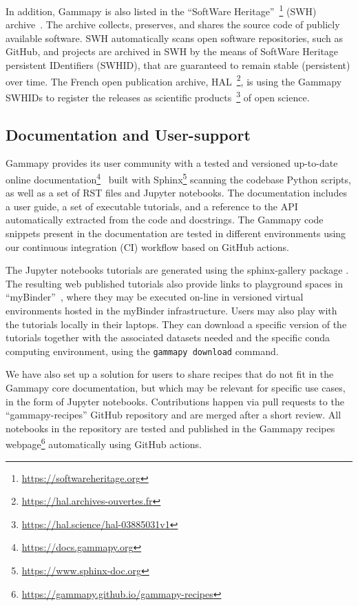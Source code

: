\documentclass[longauth]{aa}
\newcommand{\code}[1]{\texttt{#1}}
\newcommand{\gammapy}{Gammapy\xspace}
\newcommand{\github}{GitHub\xspace}
\begin{document}
In addition, \gammapy is also listed in the \enquote{SoftWare
Heritage}~\footnote{\url{https://softwareheritage.org}} (SWH) archive~\cite{DiCosmo2020}.
The archive collects, preserves, and shares the source code of publicly available software.
SWH automatically scans open software repositories, such as GitHub, and projects are archived in SWH by the
means of SoftWare Heritage persistent IDentifiers (SWHID), that are guaranteed to remain stable (persistent)
over time. The French open publication archive, HAL~\footnote{\url{https://hal.archives-ouvertes.fr}},
is using the \gammapy SWHIDs to register the releases as scientific
products~\footnote{\url{https://hal.science/hal-03885031v1}} of open science.

\subsection{Documentation and User-support}
\label{ssec:documentation-and-user-support}
\gammapy provides its user community with a tested and versioned up-to-date
online
documentation\footnote{\url{https://docs.gammapy.org}}~\citep{2019ASPC..523..357B}
built with Sphinx\footnote{\url{https://www.sphinx-doc.org}} scanning the
codebase Python scripts, as well as a set of RST files and Jupyter notebooks.
The documentation includes a user guide, a set of executable
tutorials, and a reference to the API automatically extracted from the code and
docstrings. The \gammapy code snippets present in the documentation are tested
in different environments using our continuous integration (CI) workflow based
on \github actions.

The Jupyter notebooks tutorials are generated using the sphinx-gallery
package \citep{sphinx-gallery}.
The resulting web published tutorials also provide links to playground spaces in
\enquote{myBinder}~\citep{project_jupyter-proc-scipy-2018}, where they may be executed
on-line in versioned virtual environments hosted in the myBinder
infrastructure. Users may also play with the tutorials locally in their
laptops. They can download a specific version of the tutorials together with
the associated datasets needed and the specific conda computing environment,
using the \code{gammapy download} command.

We have also set up a solution for users to share recipes
that do not fit in the \gammapy core documentation, but which may be relevant for
specific use cases, in the form of Jupyter notebooks. Contributions happen via pull requests to the
\enquote{gammapy-recipes} \github repository and are merged after a short review. All
notebooks in the repository are tested and published in the \gammapy recipes
webpage\footnote{\url{https://gammapy.github.io/gammapy-recipes}} automatically
using \github actions.
\end{document}
